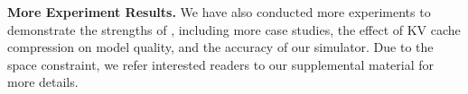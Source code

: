 
% 

% 



\noindent \textbf{More Experiment Results.} 
We have also conducted more experiments to demonstrate the strengths of \sys, including more case studies, the effect of KV cache compression on model quality, and the accuracy of our simulator. Due to the space constraint, we refer interested readers to our supplemental material for more details. 


